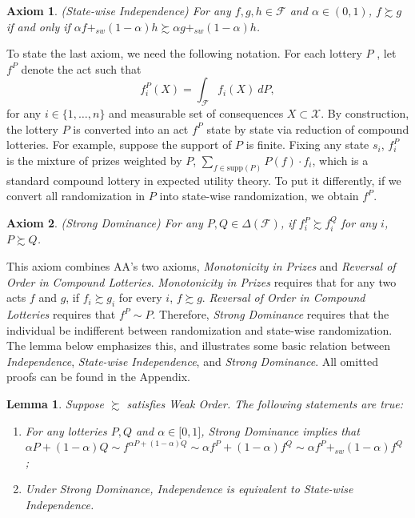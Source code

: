 \documentclass[12pt, notitlepage]{article}
\newtheorem{axiom}{Axiom}
\newtheorem{lemma}{Lemma}
\begin{document}
\begin{axiom}
(State-wise Independence) For any $f,g,h\in \mathcal{F}$ and $\alpha \in
(0,1)$, $f\succsim g$ if and only if $\alpha f+_{sw}(1-\alpha )h\succsim
\alpha g+_{sw}(1-\alpha )h$.
\end{axiom}

To state the last axiom, we need the following notation. For each lottery $P$%
, let $f^{P}$ denote the act such that%
\begin{equation}
f_{i}^{P}(X)=\int_{\mathcal{F}}f_{i}(X)~dP,  \label{projection}
\end{equation}%
for any $i\in \{1,\dots ,n\}$ and measurable set of consequences $X\subset 
\mathcal{X}$. By construction, the lottery $P$ is converted into an act $%
f^{P}$ state by state via reduction of compound lotteries. For example,
suppose the support of $P$ is finite. Fixing any state $s_{i}$, $f_{i}^{P}$
is the mixture of prizes weighted by $P$, $\sum_{f\in \text{supp}%
(P)}P(f)\cdot f_{i}$, which is a standard compound lottery in expected
utility theory. To put it differently, if we convert all randomization in $P$
into state-wise randomization, we obtain $f^{P}$.

\begin{axiom}
(Strong Dominance) For any $P,Q\in \Delta (\mathcal{F})$, if $%
f_{i}^{P}\succsim f_{i}^{Q}$ for any $i$, $P\succsim Q$.
\end{axiom}

This axiom combines AA's two axioms, \textit{Monotonicity in Prizes} and 
\textit{Reversal of Order in Compound Lotteries}. \textit{Monotonicity in
Prizes} requires that for any two acts $f$ and $g$, if $f_{i}\succsim g_{i}$
for every $i$, $f\succsim g$. \textit{Reversal of Order in Compound Lotteries%
} requires that $f^{P}\sim P$. Therefore, \textit{Strong Dominance} requires
that the individual be indifferent between randomization and state-wise
randomization. The lemma below emphasizes this, and illustrates some basic
relation between \textit{Independence}, \textit{State-wise Independence},
and \textit{Strong Dominance}. All omitted proofs can be found in the
Appendix.

\begin{lemma}
\label{triangle}Suppose $\succsim $ satisfies Weak Order. The following
statements are true:

\begin{enumerate}
\item For any lotteries $P,Q$ and $\alpha \in \lbrack 0,1]$, Strong
Dominance implies that $\alpha P+(1-\alpha )Q\sim f^{\alpha P+(1-\alpha
)Q}\sim \alpha f^{P}+(1-\alpha )f^{Q}\sim \alpha f^{P}+_{sw}(1-\alpha )f^{Q}$%
;

\item Under Strong Dominance, Independence is equivalent to State-wise
Independence.
\end{enumerate}
\end{lemma}
\end{document}
